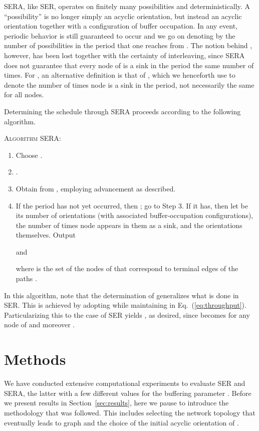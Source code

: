 \documentclass{article}
\begin{document}
SERA, like SER, operates on finitely many possibilities and deterministically.
A ``possibility'' is no longer simply an acyclic orientation, but instead an
acyclic orientation together with a configuration of buffer occupation. In any
event, periodic behavior is still guaranteed to occur and we go on denoting by
 the number of possibilities in the period that one reaches from
. The notion behind , however, has been lost together
with the certainty of interleaving, since SERA does not guarantee that every
node of  is a sink in the period the same number of times. For , an
alternative definition is that of , which we henceforth use to
denote the number of times node  is a sink in the period, not necessarily the
same for all nodes.

Determining the schedule  through SERA proceeds according to the
following algorithm.

\bigskip\noindent
\textsc{Algorithm} SERA:
\begin{enumerate}
\item Choose .
\item .
\item Obtain  from , employing advancement as described.
\item If the period has not yet occurred, then ; go to Step 3. If it
has, then let  be its number of orientations (with associated
buffer-occupation configurations),  the number of times node 
appears in them as a sink, and
 the orientations
themselves. Output

and

where  is the set of the nodes of  that correspond to terminal edges of
the paths .
\end{enumerate}

In this algorithm, note that the determination of  generalizes
what is done in SER. This is achieved by adopting
 while maintaining
 in Eq.~(\ref{eq:throughput}).
Particularizing this to the case of SER yields
, as desired, since
 becomes  for any node  of  and moreover
.

\section{Methods}\label{sec:methods}

We have conducted extensive computational experiments to evaluate SER and SERA,
the latter with a few different values for the buffering parameter . Before
we present results in Section~\ref{sec:results}, here we pause to introduce the
methodology that was followed. This includes selecting the network topology that
eventually leads to graph  and the choice of the initial acyclic orientation
of .
\end{document}
